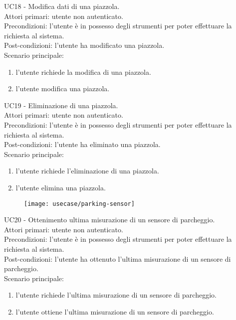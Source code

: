 \leavevmode\newline
UC18 - Modifica dati di una piazzola.
\\
Attori primari: utente non autenticato.
\\
Precondizioni: l'utente è in possesso degli strumenti per poter effettuare la richiesta al sistema.
\\
Post-condizioni: l'utente ha modificato una piazzola.
\\
Scenario principale:
\begin{enumerate}
    \item l'utente richiede la modifica di una piazzola.
    \item l'utente modifica una piazzola.
\end{enumerate}
\leavevmode\newline
UC19 - Eliminazione di una piazzola.
\\
Attori primari: utente non autenticato.
\\
Precondizioni: l'utente è in possesso degli strumenti per poter effettuare la richiesta al sistema.
\\
Post-condizioni: l'utente ha eliminato una piazzola.
\\
Scenario principale:
\begin{enumerate}
    \item l'utente richiede l'eliminazione di una piazzola.
    \item l'utente elimina una piazzola.
\end{enumerate}

\leavevmode\newline
\begin{figure}[!h]
    \centering
    \texttt{[image: usecase/parking-sensor]}
\end{figure}
UC20 - Ottenimento ultima misurazione di un sensore di parcheggio.
\\
Attori primari: utente non autenticato.
\\
Precondizioni: l'utente è in possesso degli strumenti per poter effettuare la richiesta al sistema.
\\
Post-condizioni: l'utente ha ottenuto l'ultima misurazione di un sensore di parcheggio.
\\
Scenario principale:
\begin{enumerate}
    \item l'utente richiede l'ultima misurazione di un sensore di parcheggio.
    \item l'utente ottiene l'ultima misurazione di un sensore di parcheggio.
\end{enumerate}


